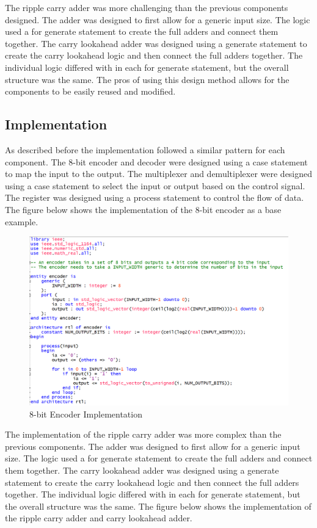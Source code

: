 \documentclass{article}
\begin{document}
The ripple carry adder was more challenging than the previous components designed. The adder was designed to first allow for a generic input size. The logic used a for generate statement to create the full adders and connect them together. The carry lookahead adder was designed using a generate statement to create the carry lookahead logic and then connect the full adders together. The individual logic differed with in each for generate statement, but the overall structure was the same. The pros of using this design method allows for the components to be easily reused and modified.
\subsection*{Implementation}
As described before the implementation followed a similar pattern for each component. The 8-bit encoder and decoder were designed using a case statement to map the input to the output. The multiplexer and demultiplexer were designed using a case statement to select the input or output based on the control signal. The register was designed using a process statement to control the flow of data. The figure below shows the implementation of the 8-bit encoder as a base example.

\begin{figure}[H]
  \centering
  \includegraphics[scale=0.5]{Encoder_Impl.png}
  \caption{8-bit Encoder Implementation}
\end{figure}

The implementation of the ripple carry adder was more complex than the previous components. The adder was designed to first allow for a generic input size. The logic used a for generate statement to create the full adders and connect them together. The carry lookahead adder was designed using a generate statement to create the carry lookahead logic and then connect the full adders together. The individual logic differed with in each for generate statement, but the overall structure was the same. The figure below shows the implementation of the ripple carry adder and carry lookahead adder.
\end{document}
